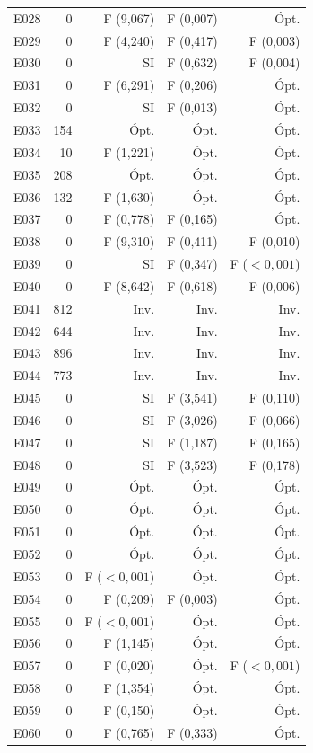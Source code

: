 \begin{longtable}{lrrrr}
E028 & 0 & F (9,067) & F (0,007) & Ópt. \\
E029 & 0 & F (4,240) & F (0,417) & F (0,003) \\
E030 & 0 & SI & F (0,632) & F (0,004) \\
E031 & 0 & F (6,291) & F (0,206) & Ópt. \\
E032 & 0 & SI & F (0,013) & Ópt. \\
E033 & 154 & Ópt. & Ópt. & Ópt. \\
E034 & 10 & F (1,221) & Ópt. & Ópt. \\
E035 & 208 & Ópt. & Ópt. & Ópt. \\
E036 & 132 & F (1,630) & Ópt. & Ópt. \\
E037 & 0 & F (0,778) & F (0,165) & Ópt. \\
E038 & 0 & F (9,310) & F (0,411) & F (0,010) \\
E039 & 0 & SI & F (0,347) & F ($<0,001$) \\
E040 & 0 & F (8,642) & F (0,618) & F (0,006) \\
E041 & 812 & Inv. & Inv. & Inv. \\
E042 & 644 & Inv. & Inv. & Inv. \\
E043 & 896 & Inv. & Inv. & Inv. \\
E044 & 773 & Inv. & Inv. & Inv. \\
E045 & 0 & SI & F (3,541) & F (0,110) \\
E046 & 0 & SI & F (3,026) & F (0,066) \\
E047 & 0 & SI & F (1,187) & F (0,165) \\
E048 & 0 & SI & F (3,523) & F (0,178) \\
E049 & 0 & Ópt. & Ópt. & Ópt. \\
E050 & 0 & Ópt. & Ópt. & Ópt. \\
E051 & 0 & Ópt. & Ópt. & Ópt. \\
E052 & 0 & Ópt. & Ópt. & Ópt. \\
E053 & 0 & F ($<0,001$) & Ópt. & Ópt. \\
E054 & 0 & F (0,209) & F (0,003) & Ópt. \\
E055 & 0 & F ($<0,001$) & Ópt. & Ópt. \\
E056 & 0 & F (1,145) & Ópt. & Ópt. \\
E057 & 0 & F (0,020) & Ópt. & F ($<0,001$) \\
E058 & 0 & F (1,354) & Ópt. & Ópt. \\
E059 & 0 & F (0,150) & Ópt. & Ópt. \\
E060 & 0 & F (0,765) & F (0,333) & Ópt. \\

\end{longtable}
